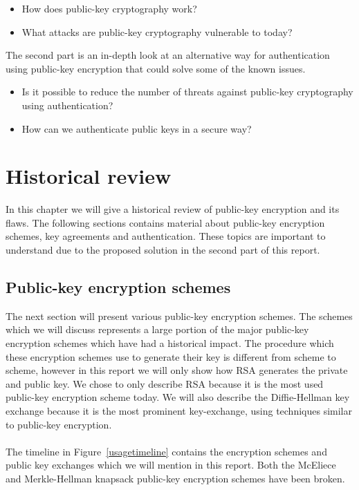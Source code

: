 \documentclass[frame, english]{idamasterthesis}
\begin{document}
\begin{itemize}
    \item How does public-key cryptography work? 
    \item What attacks are public-key cryptography vulnerable to today? 
\end{itemize}

\noindent
The second part is an in-depth look at an alternative way for authentication using public-key encryption that could solve some of the known issues.

\begin{itemize}
    \item Is it possible to reduce the number of threats against public-key cryptography using authentication?
    \item How can we authenticate public keys in a secure way?
\end{itemize}
    
\chapter{Historical review}
\chaptermark{}
In this chapter we will give a historical review of public-key encryption and its flaws. The following sections contains material about public-key encryption schemes, key agreements and authentication. These topics are important to understand due to the proposed solution in the second part of this report. 

\section{Public-key encryption schemes}
The next section will present various public-key encryption schemes. The schemes which we will discuss represents a large portion of the major public-key encryption schemes which have had a historical impact. The procedure which these encryption schemes use to generate their key is different from scheme to scheme, however in this report we will only show how RSA generates the private and public key. We chose to only describe RSA because it is the most used public-key encryption scheme today. We will also describe the Diffie-Hellman key exchange because it is the most prominent key-exchange, using techniques similar to public-key encryption.\\\\
\noindent
The timeline in Figure~\ref{usagetimeline} contains the encryption schemes and public key exchanges which we will mention in this report. Both the McEliece  and Merkle-Hellman knapsack public-key encryption schemes have been broken. 
\end{document}
